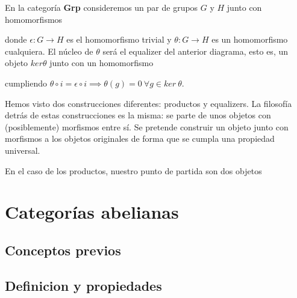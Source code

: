 \begin{ejemplo}
    En la categoría \textbf{Grp} consideremos un par de grupos $G$ y $H$ junto con homomorfismos  donde $\epsilon: G \longrightarrow H$ es el homomorfismo trivial y $\theta: G \longrightarrow H$ es un homomorfismo cualquiera. El núcleo de $\theta$ será el equalizer del anterior diagrama, esto es, un objeto $ker \theta$ junto con un homomorfismo  cumpliendo $\theta \circ i = \epsilon \circ i \implies \theta(g) = 0 \ \forall g \in ker \ \theta $.
\end{ejemplo}

Hemos visto dos construcciones diferentes: productos y equalizers. La filosofía detrás de estas construcciones es la misma: se parte de unos objetos con (posiblemente) morfismos entre sí. Se pretende construir un objeto junto con morfismos a los objetos originales de forma que se cumpla una propiedad universal.  

En el caso de los productos, nuestro punto de partida son dos objetos 


\begin{definicion}
    
\end{definicion}

\section{Categorías abelianas}

\subsection{Conceptos previos}

\subsection{Definicion y propiedades}

